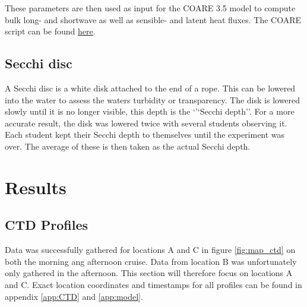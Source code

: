 \documentclass[a4paper,10pt,english]{article}
\begin{document}
These parameters are then used as input for the COARE 3.5 model to compute bulk long- and shortwave as well as sensible- and latent heat fluxes. The COARE script can be found \href{https://github.com/kaihc/GEO2320/blob/main/cruise/airsea_data.ipynb}{here}.

\subsection{Secchi disc}
A Secchi disc is a white disk attached to the end of a rope. This can be lowered into the water to assess the waters turbidity or transparency. The disk is lowered slowly until it is no longer visible, this depth is the `'`Secchi depth''. For a more accurate result, the disk was lowered twice with several students observing it. Each student kept their Secchi depth to themselves until the experiment was over. The average of these is then taken as the actual Secchi depth. 


\section{Results}\label{sec:results}
\setlength{\intextsep}{12pt}


\subsection{CTD Profiles}
Data was successfully gathered for locations A and C in figure \ref*{fig:map_ctd} on both the morning ang afternoon cruise. Data from location B was unfortunately only gathered in the afternoon. This section will therefore focus on locations A and C. Exact location coordinates and timestamps for all profiles can be found in appendix \ref*{app:CTD} and \ref*{app:model}.
\end{document}
